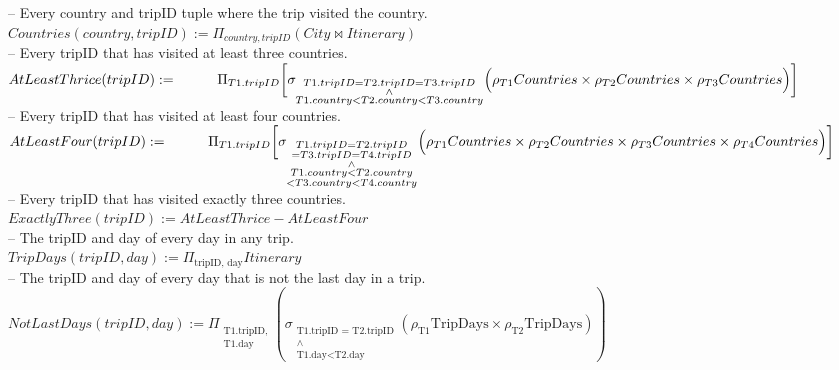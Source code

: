 \documentclass{article}
\begin{document}
\begin{enumerate}
{\large
    \item -- Every country and tripID tuple where the trip visited the country. \\[5pt]
    $Countries(country, tripID) := \Pi_{country, tripID} (City \bowtie Itinerary)$ \\[10pt]
    -- Every tripID that has visited at least three countries. \\[5pt]
    $AtLeastThrice(tripID) := \\[5pt]
    \hspace*{1cm} \Pi_{T1.tripID} \bigg[ \sigma_{\substack{T1.tripID = T2.tripID = T3.tripID \\ \wedge \\ T1.country < T2.country < T3.country}} \Big( \rho_{T1} Countries \times \rho_{T2} Countries \times \rho_{T3} Countries \Big) \bigg]$ \\[10pt]
    -- Every tripID that has visited at least four countries. \\[5pt]
    $AtLeastFour(tripID) := \\[5pt]
    \hspace*{1cm} \Pi_{T1.tripID} \bigg[ \sigma_{\substack{T1.tripID = T2.tripID \\ = T3.tripID = T4.tripID \\ \wedge \\ T1.country < T2.country \\ < T3.country < T4.country}} \Big( \rho_{T1} Countries \times \rho_{T2} Countries \times \rho_{T3} Countries \times \rho_{T4} Countries \Big) \bigg]$ \\[10pt]
    -- Every tripID that has visited exactly three countries. \\[5pt]
    $ExactlyThree(tripID) := AtLeastThrice - AtLeastFour$ \\[10pt]
    -- The tripID and day of every day in any trip. \\[5pt]
    $TripDays(tripID, day) := \Pi_{\text{tripID, day}} Itinerary$ \\[10pt]
    -- The tripID and day of every day that is not the last day in a trip. \\[5pt]
    $NotLastDays(tripID, day) := \Pi_{\substack{\text{T1.tripID,} \\ \text{T1.day}}} (\sigma_{\substack{\text{T1.tripID = T2.tripID} \\ \wedge \\ \text{T1.day} < \text{T2.day}}} (\rho_{\text{T1}}\text{TripDays} \times \rho_{\text{T2}}\text{TripDays}))$ \\[10pt]
}
\end{enumerate}
\end{document}
